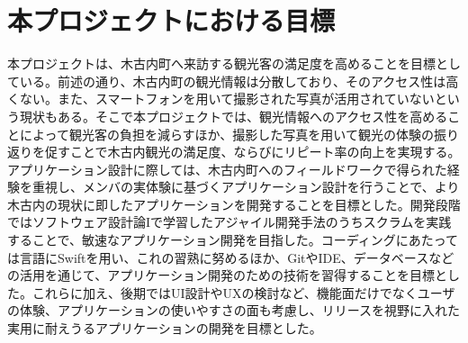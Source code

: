\section{本プロジェクトにおける目標}
本プロジェクトは、木古内町へ来訪する観光客の満足度を高めることを目標としている。前述の通り、木古内町の観光情報は分散しており、そのアクセス性は高くない。また、スマートフォンを用いて撮影された写真が活用されていないという現状もある。そこで本プロジェクトでは、観光情報へのアクセス性を高めることによって観光客の負担を減らすほか、撮影した写真を用いて観光の体験の振り返りを促すことで木古内観光の満足度、ならびにリピート率の向上を実現する。アプリケーション設計に際しては、木古内町へのフィールドワークで得られた経験を重視し、メンバの実体験に基づくアプリケーション設計を行うことで、より木古内の現状に即したアプリケーションを開発することを目標とした。開発段階ではソフトウェア設計論Iで学習したアジャイル開発手法のうちスクラムを実践することで、敏速なアプリケーション開発を目指した。コーディングにあたっては言語にSwiftを用い、これの習熟に努めるほか、GitやIDE、データベースなどの活用を通じて、アプリケーション開発のための技術を習得することを目標とした。これらに加え、後期ではUI設計やUXの検討など、機能面だけでなくユーザの体験、アプリケーションの使いやすさの面も考慮し、リリースを視野に入れた実用に耐えうるアプリケーションの開発を目標とした。
